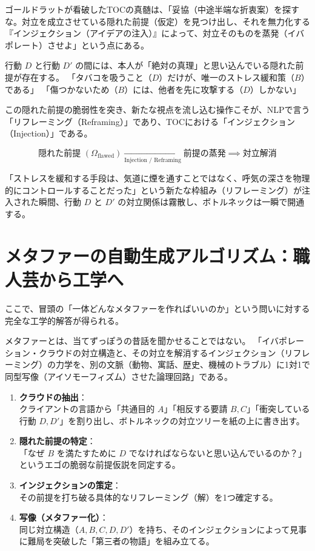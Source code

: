 ゴールドラットが看破したTOCの真髄は、「妥協（中途半端な折衷案）を探すな。対立を成立させている隠れた前提（仮定）を見つけ出し、それを無力化する『インジェクション（アイデアの注入）』によって、対立そのものを蒸発（イバポレート）させよ」という点にある。

行動 $D$ と行動 $D'$ の間には、本人が「絶対の真理」と思い込んでいる隠れた前提が存在する。
「タバコを吸うこと（$D$）だけが、唯一のストレス緩和策（$B$）である」
「傷つかないため（$B$）には、他者を先に攻撃する（$D$）しかない」

この隠れた前提の脆弱性を突き、新たな視点を流し込む操作こそが、NLPで言う「リフレーミング（Reframing）」であり、TOCにおける「インジェクション（Injection）」である。

\begin{equation}
    \text{隠れた前提 } (\Omega_{\mathrm{flawed}}) \xrightarrow[\text{Injection / Reframing}]{} \text{前提の蒸発} \implies \text{対立解消}
\end{equation}

「ストレスを緩和する手段は、気道に煙を通すことではなく、呼気の深さを物理的にコントロールすることだった」という新たな枠組み（リフレーミング）が注入された瞬間、行動 $D$ と $D'$ の対立関係は霧散し、ボトルネックは一瞬で開通する。

\section{メタファーの自動生成アルゴリズム：職人芸から工学へ}

ここで、冒頭の「一体どんなメタファーを作ればいいのか」という問いに対する完全な工学的解答が得られる。

メタファーとは、当てずっぽうの昔話を聞かせることではない。
「イバポレーション・クラウドの対立構造と、その対立を解消するインジェクション（リフレーミング）の力学を、別の文脈（動物、寓話、歴史、機械のトラブル）に1対1で同型写像（アイソモーフィズム）させた論理回路」である。

\begin{enumerate}[label=\textbf{Step \arabic*.}]
  \item \textbf{クラウドの抽出}：\\
  クライアントの言語から「共通目的 $A$」「相反する要請 $B, C$」「衝突している行動 $D, D'$」を割り出し、ボトルネックの対立ツリーを紙の上に書き出す。
  \item \textbf{隠れた前提の特定}：\\
  「なぜ $B$ を満たすために $D$ でなければならないと思い込んでいるのか？」というエゴの脆弱な前提仮説を同定する。
  \item \textbf{インジェクションの策定}：\\
  その前提を打ち破る具体的なリフレーミング（解）を1つ確定する。
  \item \textbf{写像（メタファー化）}：\\
  同じ対立構造（$A, B, C, D, D'$）を持ち、そのインジェクションによって見事に難局を突破した「第三者の物語」を組み立てる。
\end{enumerate}

